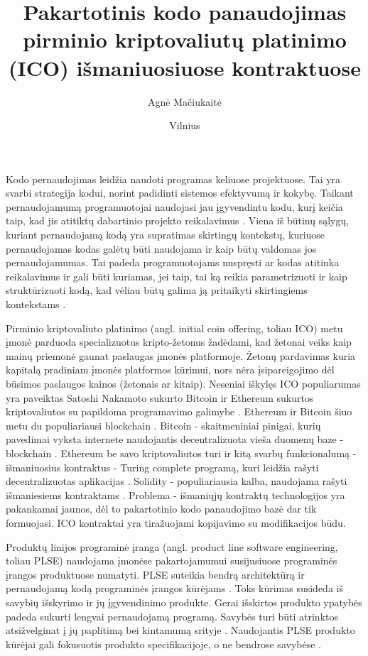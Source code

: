 \documentclass{VUMIFPSkursinis}
\title{Pakartotinis kodo panaudojimas pirminio kriptovaliutų platinimo (ICO) išmaniuosiuose kontraktuose}
\author{Agnė Mačiukaitė}
\date{Vilnius \\ \the\year}
\begin{document}
\maketitle

\tableofcontents


 \label{ivadas}

Kodo pernaudojimas leidžia naudoti programas keliuose projektuose. Tai yra svarbi strategija kodui, norint padidinti sistemos efektyvumą ir kokybę. Taikant pernaudojamumą programuotojai naudojasi jau įgyvendintu kodu, kurį keičia taip, kad jis atitiktų dabartinio projekto reikalavimus \cite {Ravichandran2003}. Viena iš būtinų sąlygų, kuriant pernaudojamą kodą yra supratimas skirtingų kontekstų, kuriuose pernaudojamas kodas galėtų būti naudojama ir kaip būtų valdomas jos pernaudojamumas. Tai padeda programuotojams nuspręsti ar kodas atitinka reikalavimus ir gali būti kuriamas, jei taip, tai ką reikia parametrizuoti ir kaip struktūrizuoti kodą, kad vėliau būtų galima ją pritaikyti skirtingiems kontekstams \cite{Kang1990}.

Pirminio kriptovaliuto platinimo (angl. initial coin offering, toliau ICO) metu įmonė parduoda specializuotus kripto-žetonus žadėdami, kad žetonai veiks kaip mainų priemonė gaunat paslaugas įmonės platformoje. Žetonų pardavimas kuria kapitalą pradiniam įmonės platformos kūrimui, nors nėra įsipareigojimo dėl būsimos paslaugos kainos (žetonais ar kitaip). Neseniai iškylęs ICO populiarumas yra paveiktas Satoshi Nakamoto sukurto Bitcoin ir Ethereum sukurtos kriptovaliutos su papildoma programavimo galimybe \cite{Catalini2018}. Ethereum ir Bitcoin šiuo metu du populiariausi blockchain \cite{Luu}. Bitcoin - skaitmeniniai pinigai, kurių pavedimai vyksta internete naudojantis decentralizuota vieša duomenų baze - blockchain \cite{Swan2015}. Ethereum be savo kriptovaliutos turi ir kitą svarbų funkcionalumą - išmaniuosius kontraktus - Turing complete programą, kuri leidžia rašyti decentralizuotas aplikacijas \cite{Buterin2014}. Solidity - populiariausia kalba, naudojama rašyti išmaniesiems kontraktams \cite{Dannen}. Problema - išmaniųjų kontraktų technologijos yra pakankamai jaunos, dėl to pakartotinio kodo panaudojimo bazė dar tik formuojasi. ICO kontraktai yra tiražuojami kopijavimo su modifikacijos būdu.

Produktų linijos programinė įranga (angl. product line software engineering, toliau PLSE) naudojama įmonėse pakartojamumui susijusiuose programinės įrangos produktuose numatyti. PLSE suteikia bendrą architektūrą ir pernaudojamą kodą programinės įrangos kūrėjams \cite{Svahnberg}. Toks kūrimas susideda iš savybių išskyrimo ir jų įgyvendinimo produkte. Gerai išskirtos produkto ypatybės padeda sukurti lengvai pernaudojamą programą. Savybės turi būti atrinktos atsižvelginat į jų paplitimą bei kintamumą srityje \cite{Lee2015}. Naudojantis PLSE produkto kūrėjai gali fokusuotis produkto specifikacijoje, o ne bendrose savybėse \cite{Svahnberg}.
\end{document}

